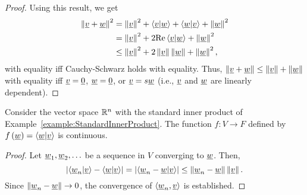 \begin{proof}
Using this result, we get
\begin{equation*}
\begin{split}
\left\| \underline{v} + \underline{w} \right\|^2
&= \left\| \underline{v} \right\|^2 + \left\langle \underline{v} | \underline{w} \right\rangle + \left\langle \underline{w} | \underline{v} \right\rangle + \left\| \underline{w} \right\|^2 \\
&= \left\| \underline{v} \right\|^2 + 2 \mathrm{Re} \left\langle \underline{v} | \underline{w} \right\rangle + \left\| \underline{w} \right\|^2 \\
&\leq \left\| \underline{v} \right\|^2 + 2 \left\| \underline{v} \right\| \left\| \underline{w} \right\| + \left\| \underline{w} \right\|^2 ,
\end{split}
\end{equation*}
with equality iff Cauchy-Schwarz holds with equality.
Thus, $\left\| \underline{v} + \underline{w} \right\| \leq \left\| \underline{v} \right\| + \left\| \underline{w} \right\|$ with equality iff $\underline{v} = \underline{0}$, $\underline{w}=\underline{0}$, or $\underline{v} = s \underline{w}$ (i.e., $\underline{v}$ and $\underline{w}$ are linearly dependent).
\end{proof}


\begin{theorem}
\label{theorem:InnerProductContinuous}
Consider the vector space $\mathbb{R}^n$ with the standard inner product of Example~\ref{example:StandardInnerProduct}.
The function $f \colon V \rightarrow F$ defined by $f \left( \underline{w} \right) = \left\langle \underline{w} | \underline{v} \right\rangle$ is continuous.
\end{theorem}
\begin{proof}
Let $\underline{w}_1, \underline{w}_2, \ldots$ be a sequence in $V$ converging to $\underline{w}$.
Then,
\begin{equation*}
\left| \left\langle \underline{w}_n | \underline{v} \right\rangle
- \left\langle \underline{w} | \underline{v} \right\rangle \right|
= \left| \left\langle \underline{w}_n - \underline{w} | \underline{v} \right\rangle \right|
\leq \left\| \underline{w}_n - \underline{w} \right\| \left\| \underline{v} \right\|.
\end{equation*}
Since $\left\| \underline{w}_n - \underline{w} \right\| \rightarrow 0$, the convergence of $\left\langle \underline{w}_n, \underline{v} \right\rangle$ is established.
\end{proof}


